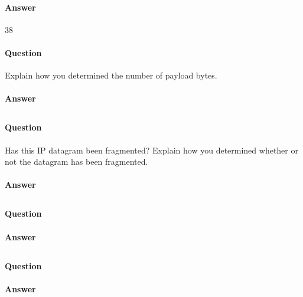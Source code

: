 \documentclass[12pt,letterpaper]{article}
\begin{document}
\paragraph{Answer} 38
\paragraph{Question} Explain how you determined the number of payload bytes.
\paragraph{Answer}

\subsection{}
\paragraph{Question} Has this IP datagram been fragmented? Explain how you 
determined whether or not the datagram has been fragmented.
\paragraph{Answer}

\subsection{}
\paragraph{Question}
\paragraph{Answer}

\subsection{}
\paragraph{Question}
\paragraph{Answer}

\subsection{}
\end{document}
